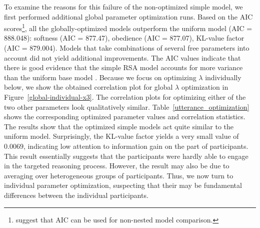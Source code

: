 \documentclass[11pt,a4paper]{article}
\begin{document}
To examine the reasons for this failure of the non-optimized simple model, we first performed additional global parameter optimization runs. Based on the AIC scores\footnote{ suggest that AIC can be used for non-nested model comparison.}, all the globally-optimized models outperform the uniform model (AIC = 888.048): softness (AIC = 877.47), obedience (AIC = 877.07), KL-value factor (AIC = 879.004).
Models that take combinations of several free parameters into account did not yield additional improvements.
The AIC values indicate that there is good evidence that the simple RSA model accounts for more variance than the uniform base model \cite{Lewandowsky:2011}.
Because we focus on optimizing $\lambda$ individually below, we show the obtained correlation plot for global $\lambda$ optimization in Figure~\ref{global-individual-x3}. 
The correlation plots for optimizing either of the two other parameters look qualitatively similar.
Table~\ref{utterance_optimization} shows the corresponding optimized parameter values and correlation statistics.
The results show that the optimized simple models act quite similar to the uniform model.
Surprisingly, the KL-value factor yields a very small value of $0.0069$, indicating low attention to information gain on the part of participants.
This result essentially suggests that the participants were hardly able to engage in the targeted reasoning process.
However, the result may also be due to averaging over heterogeneous groups of participants. 
Thus, we now turn to individual parameter optimization, suspecting that their may be fundamental differences between the individual participants. 
\end{document}
